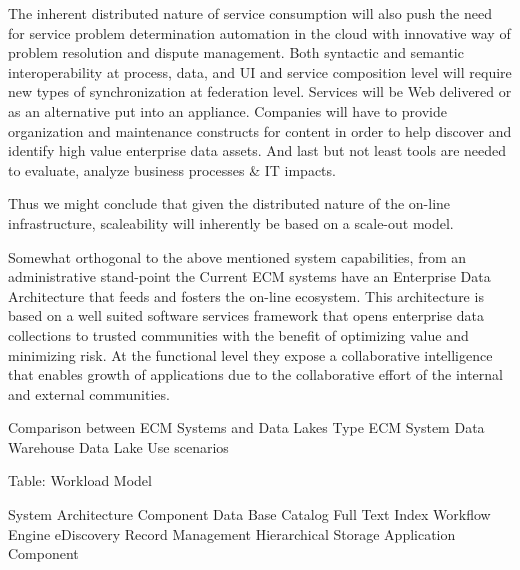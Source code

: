 The inherent distributed nature of service consumption will also push the need for service problem determination automation in the cloud with innovative way of problem resolution and dispute management. Both syntactic and semantic interoperability at process, data, and UI and service composition level will require new types of synchronization at federation level. Services will be Web delivered or as an alternative put into an appliance. Companies will have to provide organization and maintenance constructs for content in order to help discover and identify high value enterprise data assets. And last but not least tools are needed to evaluate, analyze business processes \& IT impacts. 
 
Thus we might conclude that given the distributed nature of the on-line infrastructure, scaleability will inherently be based on a scale-out model.   
 
Somewhat orthogonal to the above mentioned system capabilities, from an administrative stand-point the Current ECM systems have an Enterprise Data Architecture that feeds and fosters the on-line ecosystem. This architecture is based on a well suited software services framework that opens enterprise data collections to trusted communities with the benefit of optimizing value and minimizing risk. At the functional level they expose a collaborative intelligence that enables growth of applications due to the collaborative effort of the internal and external communities.

Comparison between ECM Systems and Data Lakes
Type	ECM System	Data Warehouse	Data Lake
Use scenarios			
			
Table: Workload Model			
			
System Architecture Component 			
Data Base 	Catalog 		
Full Text Index			
Workflow Engine			
eDiscovery			
Record Management 			
Hierarchical Storage			
Application Component			
			

    



